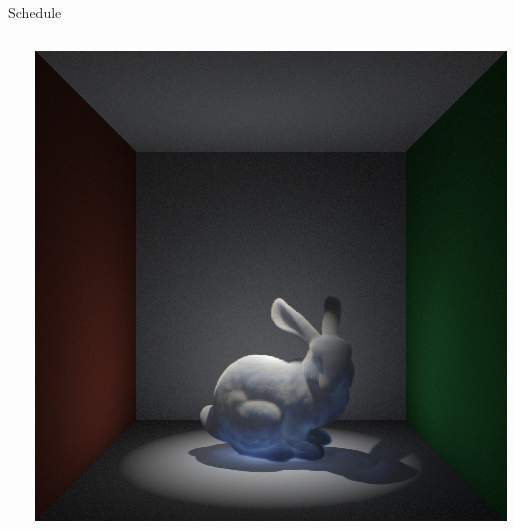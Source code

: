 \documentclass[10pt,compress,professionalfont]{beamer}
\begin{document}
\begin{frame}{Schedule}


    \begin{columns}
        \begin{column}{0.5\textwidth}
            \tableofcontents[hideallsubsections]
        \end{column}
        \begin{column}{0.5\textwidth}
            \includegraphics[width=\textwidth]{../img/spot_top_crop}
        \end{column}
    \end{columns}

\end{frame}
\end{document}
